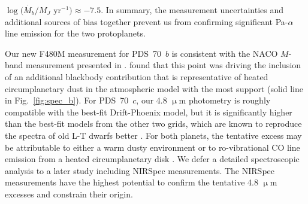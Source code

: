 \documentclass[longauth]{aa}
\begin{document}
$\log(\dot{M_b}/M_J$ yr$^{-1}) \approx -7.5$.
In summary, the measurement uncertainties and additional sources of bias together prevent us from confirming significant Pa-$\alpha$ line emission for the two protoplanets.

Our new F480M measurement for PDS~70~$b$ is consistent with the NACO $M$-band measurement presented in \citet{Stolker2020}. \citet{Wang2021} found that this point was driving the inclusion of an additional blackbody contribution that is representative of heated circumplanetary dust in the atmospheric model with the most support (solid line in Fig.~\ref{fig:spec_b}). 
For PDS~70~$c$, %
our 4.8 $\upmu$m photometry is roughly compatible with the best-fit Drift-Phoenix model, but it is significantly higher than the best-fit models from the other two grids, which are known to reproduce the spectra of old L-T dwarfs better \citep[e.g.,][]{Witte2011}.
For both planets, the tentative excess may be attributable to either a warm dusty environment or to ro-vibrational CO line emission from a heated circumplanetary disk \citep[e.g.,][]{Oberg2023}.
We defer a detailed spectroscopic analysis to a later study including NIRSpec measurements. The NIRSpec measurements %
have the highest potential to confirm the tentative 4.8 $\upmu$m excesses and constrain their origin.
\end{document}
